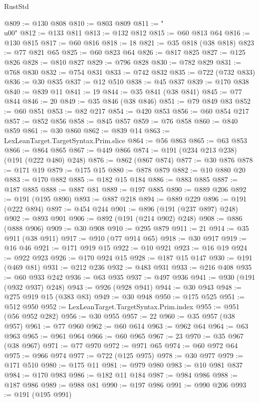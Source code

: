 \begin{lexlean}{RustStd}
\begin{coremodule}
{\begin{coremodule}
{{{{{{{{{{{{{{{{{{{{{{{{{{{{{{{{@809 := @130 @808
@810 := @803 @809
@811 := "\\u00"
@812 := @133 @811
@813 := @132 @812
@815 := @60 @813 @64
@816 := @130 @815
@817 := @60 @816
@818 := 18
@821 := @35 @818 (@38 @818)
@823 := @77 @821 @65
@825 := @60 @823 @64
@826 := @817 @825
@827 := @125 @826
@828 := @810 @827
@829 := @796 @828
@830 := @782 @829
@831 := @768 @830
@832 := @754 @831
@833 := @742 @832
@835 := @722 (@732 @833)
@836 := @30 @835
@837 := @12 @510
@838 := @45 @837
@839 := @170 @838
@840 := @839 @11
@841 := 19
@844 := @35 @841 (@38 @841)
@845 := @77 @844
@846 := 20
@849 := @35 @846 (@38 @846)
@851 := @79 @849 @83
@852 := @60 @851
@853 := @82 @217
@854 := @420 @853
@856 := @60 @854 @217
@857 := @852 @856
@858 := @845 @857
@859 := @76 @858
@860 := @840 @859
@861 := @30 @860
@862 := @839 @14
@863 := LexLeanTarget.TargetSyntax.Prim.slice
@864 := @56 @863
@865 := @63 @853
@866 := @864 @865
@867 := @449 @866
@874 := @191 (@234 @213 @238) (@191 (@222 @480) @248)
@876 := @862 (@867 @874)
@877 := @30 @876
@878 := @171 @19
@879 := @175 @15
@880 := @878 @879
@882 := @10 @880 @20
@883 := @170 @882
@885 := @182 @15 @184
@886 := @883 @885
@887 := @187 @885
@888 := @887 @81
@889 := @197 @885
@890 := @889 @206
@892 := @191 (@195 @890)
@893 := @887 @218
@894 := @889 @229
@896 := @191 (@222 @894)
@897 := @454 @244
@901 := @896 (@191 (@237 @897) @248)
@902 := @893 @901
@906 := @892 (@191 (@214 @902) @248)
@908 := @886 (@888 @906)
@909 := @30 @908
@910 := @295 @879
@911 := 21
@914 := @35 @911 (@38 @911)
@917 := @910 (@77 @914 @65)
@918 := @30 @917
@919 := @16 @46
@921 := @171 @919 @15
@922 := @10 @921
@923 := @16 @19
@924 := @922 @923
@926 := @170 @924 @15
@928 := @187 @15 @147
@930 := @191 (@469 @81)
@931 := @212 @236
@932 := @483 @931
@933 := @216 @408
@935 := @60 @933 @242
@936 := @63 @935
@937 := @497 @936
@941 := @930 (@191 (@932 @937) @248)
@943 := @926 (@928 @941)
@944 := @30 @943
@948 := @275 @919 @15 (@383 @83)
@949 := @30 @948
@950 := @175 @525
@951 := @512 @950
@952 := LexLeanTarget.TargetSyntax.Prim.index
@955 := @951 (@56 @952 @282)
@956 := @30 @955
@957 := 22
@960 := @35 @957 (@38 @957)
@961 := @77 @960
@962 := @60 @614
@963 := @962 @64
@964 := @63 @963
@965 := @961 @964
@966 := @60 @965
@967 := 23
@970 := @35 @967 (@38 @967)
@971 := @77 @970
@972 := @971 @65
@974 := @60 @972 @64
@975 := @966 @974
@977 := @722 (@125 @975)
@978 := @30 @977
@979 := @171 @510
@980 := @175 @11
@981 := @979 @980
@983 := @10 @981 @837
@984 := @170 @983
@986 := @182 @11 @184
@987 := @984 @986
@988 := @187 @986
@989 := @988 @81
@990 := @197 @986
@991 := @990 @206
@993 := @191 (@195 @991)
}}}}}}}}}}}}}}}}}}}}}}}}}}}}}}}}
\end{coremodule}}
\end{coremodule}
\end{lexlean}
